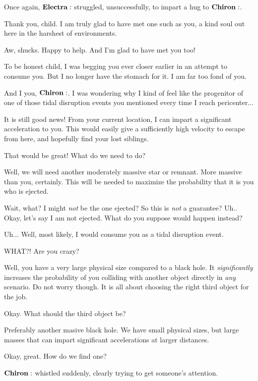 \documentclass[main.tex]{subfiles}
\begin{document}
Once again, $\Electra$ struggled, unsuccessfully, to impart a hug to $\Chiron$.

\Chiron Thank you, child.  I am truly glad to have met one such as you, a kind soul out here in the harshest of environments.

\Electra Aw, shucks.  Happy to help.  And I'm glad to have met you too!

\Chiron To be honest child, I was begging you ever closer earlier in an attempt to consume you.  But I no longer have the stomach for it.  I am far too fond of you.

\Electra And I you, $\Chiron$.  I was wondering why I kind of feel like the progenitor of one of those tidal disruption events you mentioned every time I reach pericenter...

\Chiron It is still good news!  From your current location, I can impart a significant acceleration to you.  This would easily give a sufficiently high velocity to escape from here, and hopefully find your lost siblings.

\Electra  That would be great!  What do we need to do?

\Chiron Well, we will need another moderately massive star or remnant.  More massive than you, certainly.  This will be needed to maximize the probability that it is you who is ejected.

\Electra Wait, what?  I might \textit{not} be the one ejected?  So this is \textit{not} a guarantee?  Uh.. Okay, let's say I am not ejected.  What do you suppose would happen instead?

\Chiron Uh... Well, most likely, I would consume you as a tidal disruption event.

\Electra WHAT?!  Are you crazy? 

\Chiron Well, you have a very large physical size compared to a black hole.  It \textit{significantly} increases the probability of you colliding with another object directly in \textit{any} scenario.  Do not worry though.  It is all about choosing the right third object for the job.  

\Electra Okay.  What should the third object be?

\Chiron Preferably another masive black hole.  We have small physical sizes, but large masses that can impart significant accelerations at larger distances.

\Electra Okay, great.  How do we find one?

$\Chiron$ whistled suddenly, clearly trying to get someone's attention.
\end{document}
